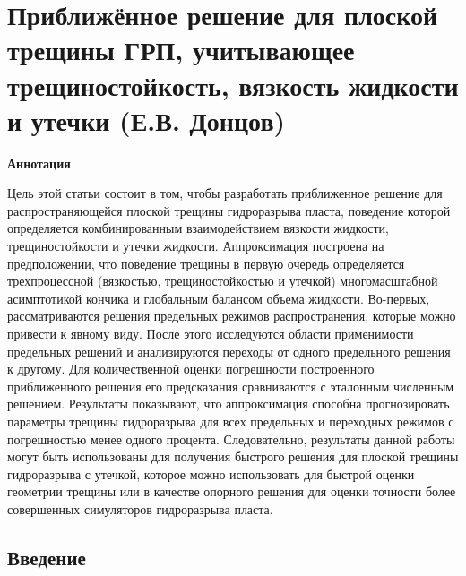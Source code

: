 \documentclass[main.tex]{subfiles}
\begin{document}
\section*{Приближённое решение для плоской трещины ГРП, учитывающее трещиностойкость, вязкость жидкости и утечки (Е.В. Донцов)}

\textbf{Аннотация}

Цель этой статьи состоит в том, чтобы разработать приближенное решение для распространяющейся плоской трещины гидроразрыва пласта, поведение которой определяется комбинированным взаимодействием вязкости жидкости, трещиностойкости и утечки жидкости.
Аппроксимация построена на предположении, что поведение трещины в первую очередь определяется трехпроцессной (вязкостью, трещиностойкостью и утечкой) многомасштабной асимптотикой кончика и глобальным балансом объема жидкости.
Во-первых, рассматриваются решения предельных режимов распространения, которые можно привести к явному виду.
После этого исследуются области применимости предельных решений и анализируются переходы от одного предельного решения к другому.
Для количественной оценки погрешности построенного приближенного решения его предсказания сравниваются с эталонным численным решением.
Результаты показывают, что аппроксимация способна прогнозировать параметры трещины гидроразрыва для всех предельных и переходных режимов с погрешностью менее одного процента.
Следовательно, результаты данной работы могут быть использованы для получения быстрого решения для плоской трещины гидроразрыва с утечкой, которое можно использовать для быстрой оценки геометрии трещины или в качестве опорного решения для оценки точности более совершенных симуляторов гидроразрыва пласта.

\subsection{Введение}
\end{document}
